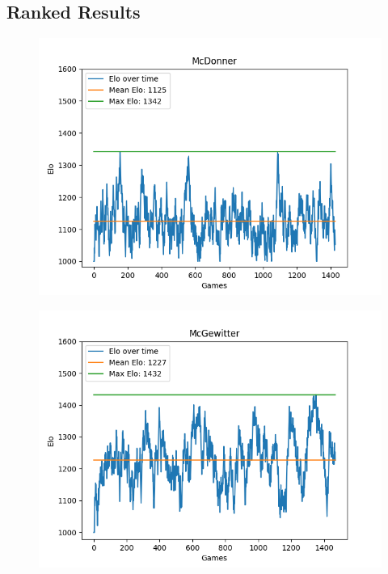 \subsection{Ranked Results}
\begin{figure}[h]
    \centering
    \begin{minipage}{.5\textwidth}
      \centering
      \includegraphics[width=1\linewidth]{images/Donner-Elo-Time.png}
      \label{fig:donner-elo}
    \end{minipage}%
    \begin{minipage}{.5\textwidth}
      \centering
      \includegraphics[width=1\linewidth]{images/Gewitter-Elo-Time.png}
      \label{fig:gewitter-elo}
    \end{minipage}
\end{figure}
    
